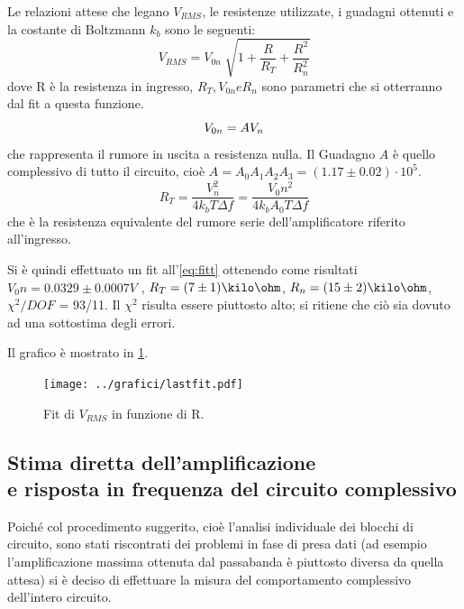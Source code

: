 \documentclass[a4paper,10pt]{article}
\begin{document}
\vspace*{-8pt}
Le relazioni attese che legano $V_{RMS}$, le resistenze utilizzate, i guadagni ottenuti e la costante di Boltzmann $k_b$ sono le seguenti:
\vspace*{-8pt}
\begin{equation}
V_{RMS} = V_{0n} \sqrt[]{1+\frac{R}{R_T}+\frac{R^2}{R_n ^2}}
\label{eq:fitt}
\end{equation}
dove R è la resistenza in ingresso, $R_T, V_{0n} e R_n$ sono parametri che si otterranno dal fit a questa funzione.
\vspace*{-3pt}
\begin{equation}
V_{0n} = A V_n
\label{eq:resnull}
\vspace*{-3pt}
\end{equation}
che rappresenta il rumore in uscita a resistenza nulla. Il Guadagno $A$ è quello complessivo di tutto il circuito, cioè $A = A_0 A_1 A_2 A_3 = (1.17\pm0.02)\cdot 10^5 $.
\vspace*{-10pt}
\begin{equation}
R_T = \frac{V_n^2}{4k_b T \Delta f} = \frac{V_0n^2}{4k_b A_0 T \Delta f}
\label{eq:kb}
\end{equation}
che è la resistenza equivalente del rumore serie dell'amplificatore riferito all'ingresso.

Si è quindi effettuato un fit all'\cref{eq:fitt} ottenendo come risultati $V_0n = 0.0329\pm0.0007 V$ , $R_T = (7\pm1) \kilo\ohm $, $R_n = (15\pm 2) \kilo\ohm$, $\chi ^2 /DOF$ = 93/11. Il $\chi ^2$ risulta essere piuttosto alto; si ritiene che ciò sia dovuto ad una sottostima degli errori.

Il grafico è mostrato in \cref{fig:lastfit}.
\vspace*{-13pt}
\begin{figure}[H]
	\centering
	\texttt{[image: ../grafici/lastfit.pdf]}
	\vspace*{-15pt}
	\caption{Fit di $V_{RMS}$ in funzione di R.}
	\label{fig:lastfit}
\end{figure}



\subsection{Stima diretta dell'amplificazione%
	\\e risposta in frequenza del circuito complessivo}
\label{sec:totamp}
Poiché col procedimento suggerito, cioè l'analisi individuale dei blocchi di circuito, sono stati riscontrati dei problemi in fase di presa dati (ad esempio l'amplificazione massima ottenuta dal passabanda è piuttosto diversa da quella attesa) si è deciso di effettuare la misura del comportamento complessivo dell'intero circuito.
\end{document}
